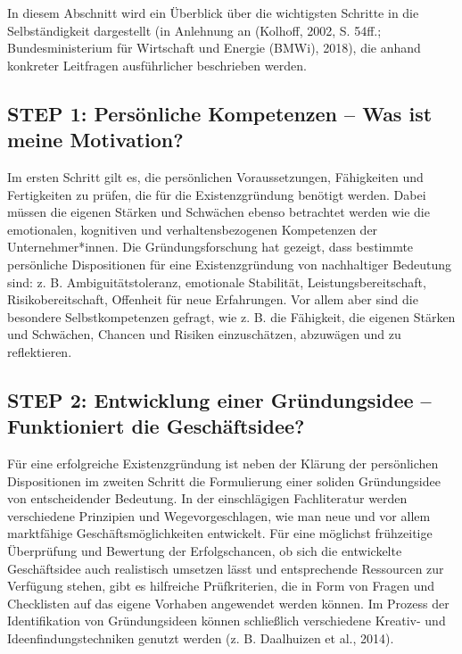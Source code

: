\documentclass[
  letterpaper,
]{book}
\begin{document}
In diesem Abschnitt wird ein Überblick über die wichtigsten Schritte in
die Selbständigkeit dargestellt (in Anlehnung an (Kolhoff, 2002, S.
54ff.; Bundesministerium für Wirtschaft und Energie (BMWi), 2018), die
anhand konkreter Leitfragen ausführlicher beschrieben werden.

\subsection{STEP 1: Persönliche Kompetenzen -- Was ist meine
Motivation?}\label{step-1-persoenliche-kompetenzen-was-ist-meine-motivation}

Im ersten Schritt gilt es, die persönlichen Voraussetzungen, Fähigkeiten
und Fertigkeiten zu prüfen, die für die Existenzgründung benötigt
werden. Dabei müssen die eigenen Stärken und Schwächen ebenso betrachtet
werden wie die emotionalen, kognitiven und verhaltensbezogenen
Kompetenzen der Unternehmer*innen. Die Gründungsforschung hat gezeigt,
dass bestimmte persönliche Dispositionen für eine Existenzgründung von
nachhaltiger Bedeutung sind: z. B. Ambiguitätstoleranz, emotionale
Stabilität, Leistungsbereitschaft, Risikobereitschaft, Offenheit für
neue Erfahrungen. Vor allem aber sind die besondere Selbstkompetenzen
gefragt, wie z. B. die Fähigkeit, die eigenen Stärken und Schwächen,
Chancen und Risiken einzuschätzen, abzuwägen und zu reflektieren.

\subsection{STEP 2: Entwicklung einer Gründungsidee -- Funktioniert die
Geschäftsidee?}\label{step-2-entwicklung-einer-gruendungsidee-funktioniert-die-geschaeftsidee}

Für eine erfolgreiche Existenzgründung ist neben der Klärung der
persönlichen Dispositionen im zweiten Schritt die Formulierung einer
soliden Gründungsidee von entscheidender Bedeutung. In der einschlägigen
Fachliteratur werden verschiedene Prinzipien und Wegevorgeschlagen, wie
man neue und vor allem marktfähige Geschäftsmöglichkeiten entwickelt.
Für eine möglichst frühzeitige Überprüfung und Bewertung der
Erfolgschancen, ob sich die entwickelte Geschäftsidee auch realistisch
umsetzen lässt und entsprechende Ressourcen zur Verfügung stehen, gibt
es hilfreiche Prüfkriterien, die in Form von Fragen und Checklisten auf
das eigene Vorhaben angewendet werden können. Im Prozess der
Identifikation von Gründungsideen können schließlich verschiedene
Kreativ- und Ideenfindungstechniken genutzt werden (z. B. Daalhuizen et
al., 2014).
\end{document}
